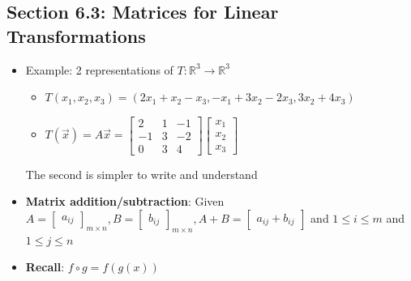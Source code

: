 \documentclass[15pt]{article}
\begin{document}
\begin{flushleft}
\section{\textbf{Section 6.3}: Matrices for Linear Transformations}
\begin{itemize}
        \item Example: 2 representations of $T: \mathbb{R}^3 \to \mathbb{R}^3$
                \begin{itemize}
                        \item $T(x_1, x_2, x_3) = (2x_1 + x_2 - x_3, -x_1 + 
                                3x_2 - 2x_3, 3x_2 + 4x_3)$
                        \item $T(\vec{x}) = A\vec{x} = \begin{bmatrix}
                                        2 & 1 & -1 \\
                                        -1 & 3 & -2 \\
                                        0 & 3 & 4
                                \end{bmatrix}
                                \begin{bmatrix}
                                        x_1 \\
                                        x_2 \\
                                        x_3
                                \end{bmatrix}$
                \end{itemize}
                The second is simpler to write and understand
        \item \textbf{Matrix addition/subtraction}: Given $A = \begin{bmatrix}
                a_{ij}\end{bmatrix}_{m \times n}, B = \begin{bmatrix} b_{ij}
                \end{bmatrix}_{m \times n}, A + B = \begin{bmatrix} a_{ij} + 
                b_{ij}\end{bmatrix}$ and $1 \leq i \leq m$ and $1 \leq j \leq n$
        \item \textbf{Recall}: $f \circ g = f(g(x))$
\end{itemize}
\end{flushleft}
\end{document}
